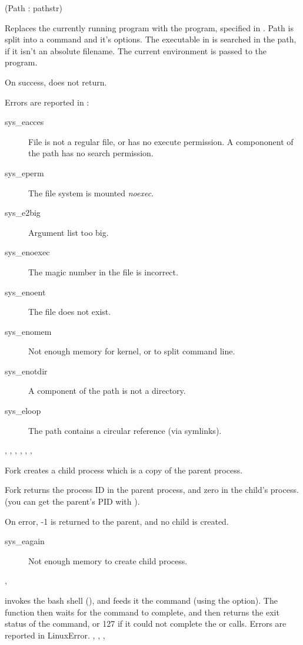 

{(Path : pathstr)}
{
Replaces the currently running program with the program, specified in
. Path is split into a command and it's options.
The executable in  is searched in the path, if it isn't
an absolute filename.
The current environment is passed to the program.

On success,  does not return.
}
{Errors are reported in :
\begin{description}
\item[sys\_eacces] File is not a regular file, or has no execute permission.
A compononent of the path has no search permission.
\item[sys\_eperm] The file system is mounted \textit{noexec}.
\item[sys\_e2big] Argument list too big.
\item[sys\_enoexec] The magic number in the file is incorrect.
\item[sys\_enoent] The file does not exist.
\item[sys\_enomem] Not enough memory for kernel, or to split command line.
\item[sys\_enotdir] A component of the path is not a directory.
\item[sys\_eloop] The path contains a circular reference (via symlinks).
\end{description}}
{, , , ,
, ,  }



{
Fork creates a child process which is a copy of the parent process.

Fork returns the process ID in the parent process, and zero in the child's
process. (you can get the parent's PID with ).
}
{On error, -1 is returned to the parent, and no child is created.
\begin{description}
\item [sys\_eagain] Not enough memory to create child process.
\end{description}
}
{, }



{ invokes the bash shell (), and feeds it the
command  (using the  option). The function then waits
for the command to complete, and then returns the exit
status of the command, or 127 if it could not complete the  
or  calls.
}
{Errors are reported in LinuxError.}
{, , , }

